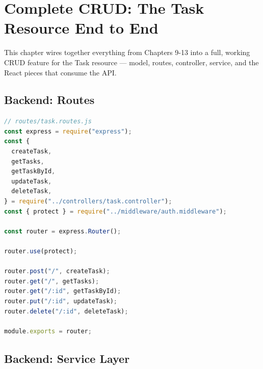 \chapter{Complete CRUD: The Task Resource End to End}

This chapter wires together everything from Chapters 9-13 into a full, working CRUD
feature for the Task resource — model, routes, controller, service, and the React
pieces that consume the API.

\section{Backend: Routes}

\begin{lstlisting}[language=JavaScript]
// routes/task.routes.js
const express = require("express");
const {
  createTask,
  getTasks,
  getTaskById,
  updateTask,
  deleteTask,
} = require("../controllers/task.controller");
const { protect } = require("../middleware/auth.middleware");

const router = express.Router();

router.use(protect);

router.post("/", createTask);
router.get("/", getTasks);
router.get("/:id", getTaskById);
router.put("/:id", updateTask);
router.delete("/:id", deleteTask);

module.exports = router;
\end{lstlisting}

\section{Backend: Service Layer}

